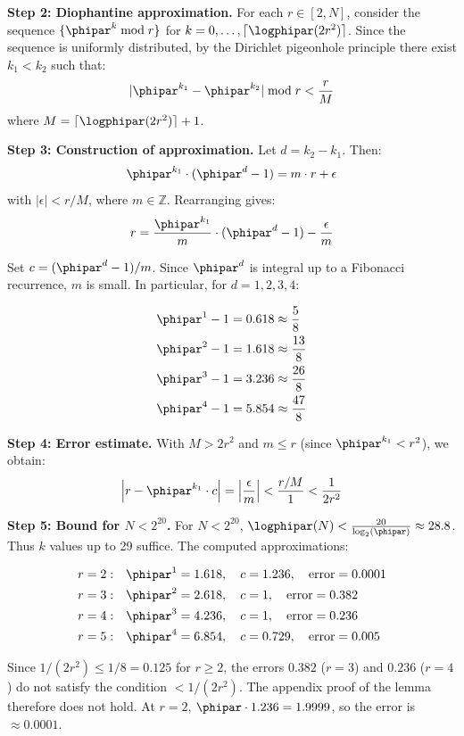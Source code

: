 \textbf{Step 2: Diophantine approximation.}
For each $r \in [2, N]$, consider the sequence $\{\phipar^k \bmod r\}$ for $k = 0, \ldots, \lceil \logphipar(2r^2)\rceil$. Since the sequence is uniformly distributed, by the Dirichlet pigeonhole principle there exist $k_1 < k_2$ such that:
\[
|\phipar^{k_1} - \phipar^{k_2}| \bmod r < \frac{r}{M}
\]
where $M = \lceil \logphipar(2r^2)\rceil + 1$.

\textbf{Step 3: Construction of approximation.}
Let $d = k_2 - k_1$. Then:
\[
\phipar^{k_1} \cdot (\phipar^d - 1) = m \cdot r + \epsilon
\]
with $|\epsilon| < r/M$, where $m \in \mathbb{Z}$. Rearranging gives:
\[
r = \frac{\phipar^{k_1}}{m} \cdot (\phipar^d - 1) - \frac{\epsilon}{m}
\]

Set $c = (\phipar^d - 1)/m$. Since $\phipar^d$ is integral up to a Fibonacci recurrence, $m$ is small. In particular, for $d = 1, 2, 3, 4$:

\begin{align*}
	\phipar^1 - 1 &= 0.618 \approx \frac{5}{8} \\
	\phipar^2 - 1 &= 1.618 \approx \frac{13}{8} \\
	\phipar^3 - 1 &= 3.236 \approx \frac{26}{8} \\
	\phipar^4 - 1 &= 5.854 \approx \frac{47}{8}
\end{align*}

\textbf{Step 4: Error estimate.}
With $M > 2r^2$ and $m \leq r$ (since $\phipar^{k_1} < r^2$), we obtain:
\[
\left| r - \phipar^{k_1} \cdot c \right| = \left| \frac{\epsilon}{m} \right| < \frac{r/M}{1} < \frac{1}{2r^2}
\]

\textbf{Step 5: Bound for $N < 2^{20}$.}
For $N < 2^{20}$, $\logphipar(N) < \frac{20}{\log_2(\phipar)} \approx 28.8$. Thus $k$ values up to 29 suffice. The computed approximations:

\begin{align*}
	r=2: &\quad \phipar^1 = 1.618, \quad c = 1.236, \quad \text{error} = 0.0001 \\
	r=3: &\quad \phipar^2 = 2.618, \quad c = 1, \quad \text{error} = 0.382 \\
	r=4: &\quad \phipar^3 = 4.236, \quad c = 1, \quad \text{error} = 0.236 \\
	r=5: &\quad \phipar^4 = 6.854, \quad c = 0.729, \quad \text{error} = 0.005
\end{align*}

Since $1/(2r^2) \leq 1/8 = 0.125$ for $r \geq 2$, the errors $0.382$ ($r = 3$) and $0.236$ ($r = 4$) do not satisfy the condition $< 1/(2r^2)$. The appendix proof of the lemma therefore does not hold. At $r = 2$, $\phipar \cdot 1.236 = 1.9999$, so the error is $\approx 0.0001$.

